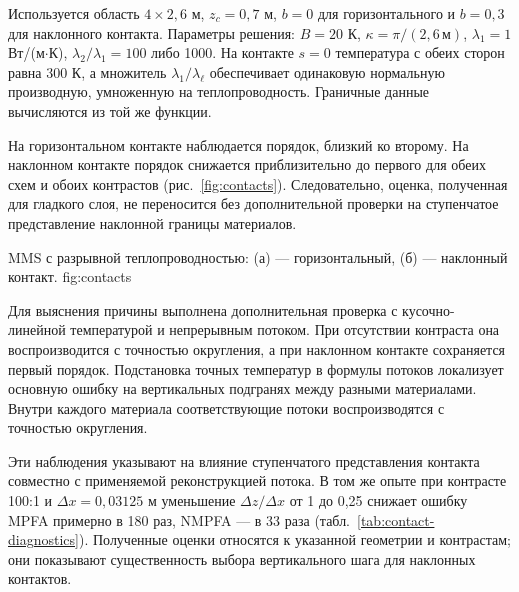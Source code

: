 Используется область $4\times2{,}6$ м, $z_c=0{,}7$ м,
$b=0$ для горизонтального и $b=0{,}3$ для наклонного контакта.
Параметры решения: $B=20$ К, $\kappa=\pi/(2{,}6\,\text{м})$,
$\lambda_1=1$ Вт/(м$\cdot$К),
$\lambda_2/\lambda_1=100$ либо 1000.
На контакте $s=0$ температура с обеих сторон равна 300 К,
а множитель $\lambda_1/\lambda_\ell$ обеспечивает одинаковую
нормальную производную, умноженную на теплопроводность.
Граничные данные вычисляются из той же функции.

На горизонтальном контакте наблюдается порядок, близкий ко второму.
На наклонном контакте порядок снижается приблизительно до первого
для обеих схем и обоих контрастов (рис.~\ref{fig:contacts}).
Следовательно, оценка, полученная для гладкого слоя,
не переносится без дополнительной проверки на ступенчатое
представление наклонной границы материалов.

  {MMS с разрывной теплопроводностью: (а) --- горизонтальный, (б) --- наклонный контакт.}
  {fig:contacts}

Для выяснения причины выполнена дополнительная проверка
с кусочно-линейной температурой и непрерывным потоком.
При отсутствии контраста она воспроизводится с точностью округления,
а при наклонном контакте сохраняется первый порядок.
Подстановка точных температур в формулы потоков локализует
основную ошибку на вертикальных подгранях между разными материалами.
Внутри каждого материала соответствующие потоки воспроизводятся
с точностью округления.

Эти наблюдения указывают на влияние ступенчатого представления
контакта совместно с применяемой реконструкцией потока.
В том же опыте при контрасте 100:1 и $\Delta x=0{,}03125$ м
уменьшение $\Delta z/\Delta x$ от 1 до 0,25 снижает ошибку MPFA
примерно в 180 раз, NMPFA --- в 33 раза
(табл.~\ref{tab:contact-diagnostics}).
Полученные оценки относятся к указанной геометрии и контрастам;
они показывают существенность выбора вертикального шага
для наклонных контактов.

